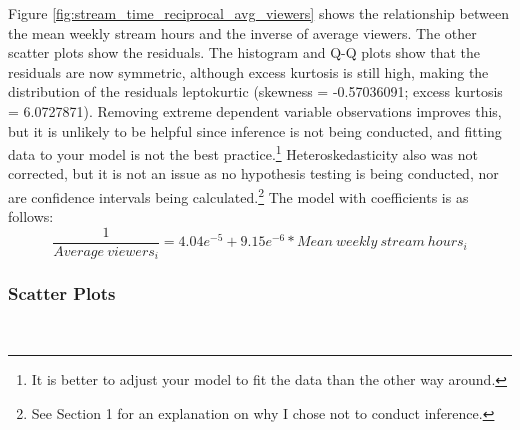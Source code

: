 \documentclass[12pt]{article}
\begin{document}

Figure \ref{fig:stream_time_reciprocal_avg_viewers} shows the relationship between the mean weekly stream hours and the inverse of average viewers. The other scatter plots show the residuals. The histogram and Q-Q plots show that the residuals are now symmetric, although excess kurtosis is still high, making the distribution of the residuals leptokurtic (skewness = -0.57036091; excess kurtosis = 6.0727871). Removing extreme dependent variable observations improves this, but it is unlikely to be helpful since inference is not being conducted, and fitting data to your model is not the best practice.\footnote{It is better to adjust your model to fit the data than the other way around.} Heteroskedasticity also was not corrected, but it is not an issue as no hypothesis testing is being conducted, nor are confidence intervals being calculated.\footnote{See Section 1 for an explanation on why I chose not to conduct inference.} The model with coefficients is as follows:
\begin{equation}
 \dfrac{1}{Average\ viewers_{i}} = 4.04e^{-5} + 9.15e^{-6} \ast Mean\ weekly\ stream\ hours_{i} \label{eq:reciprocal_model_w_coef}
\end{equation}

\subsubsection{Scatter Plots}\
\end{document}

